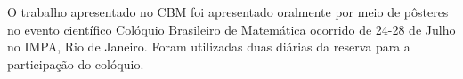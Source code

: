 \documentclass[12pt]{report}
\begin{document}
\hspace{1cm}

O trabalho apresentado no CBM foi apresentado oralmente por meio de pôsteres no evento científico Colóquio Brasileiro de Matemática ocorrido de 24-28 de Julho no IMPA, Rio de Janeiro. Foram utilizadas duas diárias da reserva para a participação do colóquio.









\end{document}
